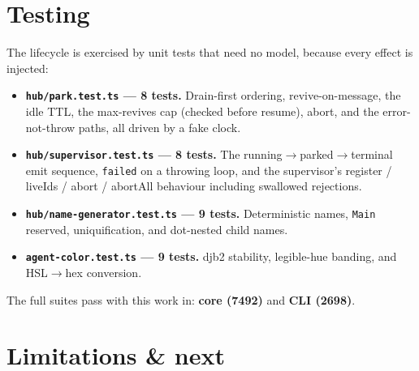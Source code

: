 \documentclass[11pt]{article}
\begin{document}
\section{Testing}

The lifecycle is exercised by unit tests that need no model, because every effect
is injected:

\begin{itemize}[leftmargin=*]
  \item \textbf{\texttt{hub/park.test.ts} --- 8 tests.} Drain-first ordering,
  revive-on-message, the idle TTL, the max-revives cap (checked before resume),
  abort, and the error-not-throw paths, all driven by a fake clock.
  \item \textbf{\texttt{hub/supervisor.test.ts} --- 8 tests.} The
  running$\rightarrow$parked$\rightarrow$terminal emit sequence, \texttt{failed} on
  a throwing loop, and the supervisor's register / liveIds / abort / abortAll
  behaviour including swallowed rejections.
  \item \textbf{\texttt{hub/name-generator.test.ts} --- 9 tests.} Deterministic
  names, \texttt{Main} reserved, uniquification, and dot-nested child names.
  \item \textbf{\texttt{agent-color.test.ts} --- 9 tests.} djb2 stability,
  legible-hue banding, and HSL$\rightarrow$hex conversion.
\end{itemize}

The full suites pass with this work in: \textbf{core (7492)} and
\textbf{CLI (2698)}.

\section{Limitations \& next}
\end{document}
